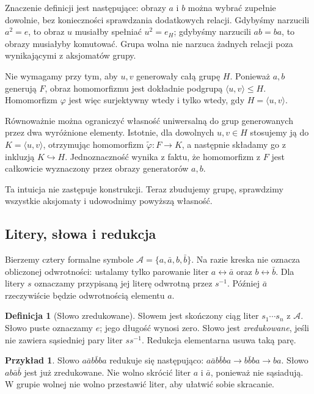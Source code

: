 \documentclass[11pt,a4paper]{article}
\numberwithin{equation}{section}
\theoremstyle{plain}
\theoremstyle{definition}
\newtheorem{definicja}[twierdzenie]{Definicja}
\newtheorem{przyklad}[twierdzenie]{Przykład}
\theoremstyle{remark}
\begin{document}
Znaczenie definicji jest następujące: obrazy $a$ i $b$ można wybrać
zupełnie dowolnie, bez konieczności sprawdzania dodatkowych relacji.
Gdybyśmy narzucili $a^2=e$, to obraz $u$ musiałby spełniać $u^2=e_H$;
gdybyśmy narzucili $ab=ba$, to obrazy musiałyby komutować.
Grupa wolna nie narzuca żadnych relacji poza wynikającymi
z aksjomatów grupy.

Nie wymagamy przy tym, aby $u,v$ generowały całą grupę $H$.
Ponieważ $a,b$ generują $F$, obraz homomorfizmu jest dokładnie
podgrupą $\langle u,v\rangle\leq H$. Homomorfizm $\varphi$
jest więc surjektywny wtedy i tylko wtedy, gdy
$H=\langle u,v\rangle$.

Równoważnie można ograniczyć własność uniwersalną do grup
generowanych przez dwa wyróżnione elementy. Istotnie, dla dowolnych
$u,v\in H$ stosujemy ją do $K=\langle u,v\rangle$, otrzymując
homomorfizm $\widetilde\varphi:F\to K$, a następnie składamy go
z inkluzją $K\hookrightarrow H$. Jednoznaczność wynika z faktu,
że homomorfizm z $F$ jest całkowicie wyznaczony przez obrazy
generatorów $a,b$.

Ta intuicja nie zastępuje konstrukcji. Teraz zbudujemy grupę, sprawdzimy wszystkie aksjomaty i udowodnimy powyższą własność.

\subsection{Litery, słowa i redukcja}
Bierzemy cztery formalne symbole $\mathcal A=\{a,\bar a,b,\bar b\}$. Na razie kreska nie oznacza obliczonej odwrotności: ustalamy tylko parowanie liter $a\leftrightarrow\bar a$ oraz $b\leftrightarrow\bar b$. Dla litery $s$ oznaczamy przypisaną jej literę odwrotną przez $s^{-1}$. Później $\bar a$ rzeczywiście będzie odwrotnością elementu $a$.
\begin{definicja}[Słowo zredukowane]
Słowem jest skończony ciąg liter $s_1\cdots s_n$ z $\mathcal A$. Słowo puste oznaczamy $e$; jego długość wynosi zero. Słowo jest \emph{zredukowane}, jeśli nie zawiera sąsiedniej pary liter $ss^{-1}$. Redukcja elementarna usuwa taką parę.
\end{definicja}
\begin{przyklad}
Słowo $a\bar a b\bar b ba$ redukuje się następująco: $a\bar a b\bar b ba\longrightarrow b\bar b ba\longrightarrow ba$. Słowo $ab\bar a\bar b$ jest już zredukowane. Nie wolno skrócić liter $a$ i $\bar a$, ponieważ nie sąsiadują. W grupie wolnej nie wolno przestawić liter, aby ułatwić sobie skracanie.
\end{przyklad}
\end{document}
